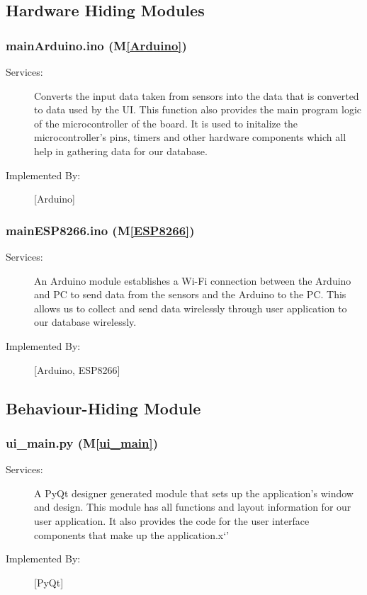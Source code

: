 \documentclass[12pt, titlepage]{article}
\newcommand{\mref}[1]{M\ref{#1}}
\begin{document}
\subsection{Hardware Hiding Modules}

\subsubsection{mainArduino.ino (\mref{Arduino})}
\begin{description}
\item[Services:]Converts the input data taken from sensors into the data that is converted to data used by the UI. This function also provides the main program logic of the microcontroller of the board. It is used to initalize the microcontroller's pins, timers and other hardware components which all help in gathering data for our database.
\item[Implemented By:] [Arduino]
\end{description}

\subsubsection{mainESP8266.ino (\mref{ESP8266})}
\begin{description}
\item[Services:] An Arduino module establishes a Wi-Fi connection between the Arduino and PC to send data from the sensors and the Arduino to the PC. This allows us to collect and send data wirelessly through user application to our database wirelessly.
\item[Implemented By:] [Arduino, ESP8266]
\end{description}

\subsection{Behaviour-Hiding Module}

\subsubsection{ui\_main.py (\mref{ui_main})}

\begin{description}
\item[Services:] A PyQt designer generated module that sets up the application's window and design. This module has all functions and layout information for our user application. It also provides the code for the user interface components that make up the application.x`'
\item[Implemented By:] [PyQt]
\end{description}
\end{document}
